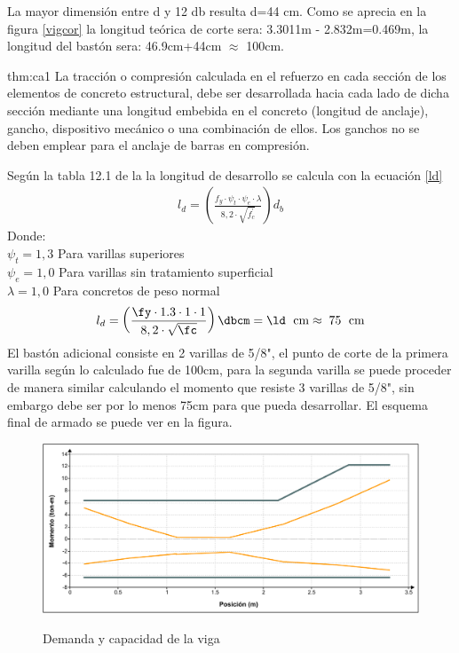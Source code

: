 \noindent La mayor dimensión entre d y 12 db resulta d=44 cm. Como se aprecia en la figura \ref{vigcor} la longitud teórica de corte sera: 3.3011m - 2.832m=0.469m, la longitud del bastón sera: 46.9cm+44cm $\approx$ 100cm.
\newpage
\begin{theo}[Art. 12.1 :]{thm:ca1}
La tracción o compresión calculada en el refuerzo en cada sección de los elementos de concreto estructural, debe ser desarrollada hacia cada lado de dicha sección mediante una longitud embebida en el concreto (longitud de anclaje), gancho, dispositivo mecánico o una combinación de ellos. Los ganchos no se deben emplear para el anclaje de barras en compresión.
\end{theo}
\noindent
Según la tabla 12.1 de la \cite{E-060} la longitud de desarrollo se calcula con la ecuación \ref{ld}
\begin{align}
l_{d}=\left(\frac{f_{y} \cdot \psi_{t} \cdot \psi_{e} \cdot \lambda}{8,2 \cdot \sqrt{f_{c}^{\prime}}}\right) d_{b}
\label{ld}
\end{align}
\noindent
Donde:\\
$\psi_{t}=1,3$ Para varillas superiores\\
$\psi_{e}=1,0$ Para varillas sin tratamiento superficial\\
$\lambda=1,0$ Para concretos de peso normal
\FProot{}
\begin{align*}
l_{d}=\left(\frac{\fy \cdot 1.3 \cdot 1\cdot 1}{8,2 \cdot \sqrt{\fc}}\right) \dbcm=\ld\;\mathrm{~cm}\approx\;75\;\mathrm{~cm}
\end{align*}
\noindent El bastón adicional consiste en 2 varillas de 5/8", el punto de corte de la primera varilla según lo calculado fue de 100cm, para la segunda varilla se puede proceder de manera similar calculando el momento que resiste 3 varillas de 5/8", sin embargo debe ser por lo menos 75cm para que pueda desarrollar. El esquema final de armado se puede ver en la figura.
\begin{figure}[h!]
    \centering
    \caption{Demanda y capacidad de la viga}
    \includegraphics[scale=0.6]{IMAGENES/capb.pdf}
    \label{vigm}
\end{figure}

